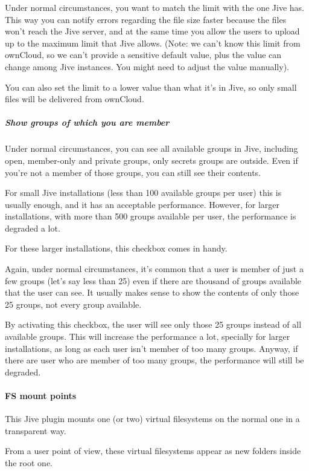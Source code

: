 \documentclass[letterpaper,10pt,english]{sphinxmanual}
\begin{document}
Under normal circumstances, you want to match the limit with the one Jive has.
This way you can notify errors regarding the file size faster because the files won't reach the Jive server, and
at the same time you allow the users to upload up to the maximum limit that Jive allows.
(Note: we can't know this limit from ownCloud, so we can't provide a sensitive default value, plus the value can
change among Jive instances. You might need to adjust the value manually).

You can also set the limit to a lower value than what it's in Jive, so only small files will be delivered from ownCloud.


\subparagraph{Show groups of which you are member}
\label{enterprise_external_storage/jive_configuration:show-groups-of-which-you-are-member}
Under normal circumstances, you can see all available groups in Jive, including open, member-only and private
groups, only secrets groups are outside. Even if you're not a member of those groups, you can still see their contents.

For small Jive installations (less than 100 available groups per user) this is usually enough, and it has an
acceptable performance. However, for larger installations, with more than 500 groups available per user, the
performance is degraded a lot.

For these larger installations, this checkbox comes in handy.

Again, under normal circumstances, it's common that a user is member of just a few groups (let's say less than 25)
even if there are thousand of groups available that the user can see. It usually makes sense to show the contents
of only those 25 groups, not every group available.

By activating this checkbox, the user will see only those 25 groups instead of
all available groups.
This will increase the performance a lot, specially for larger installations, as long as each user isn't member
of too many groups. Anyway, if there are user who are member of too many groups, the performance will still be degraded.


\paragraph{FS mount points}
\label{enterprise_external_storage/jive_configuration:fs-mount-points}
This Jive plugin mounts one (or two) virtual filesystems on the normal one in a transparent way.

From a user point of view, these virtual filesystems appear as new folders inside the root one.
\end{document}
